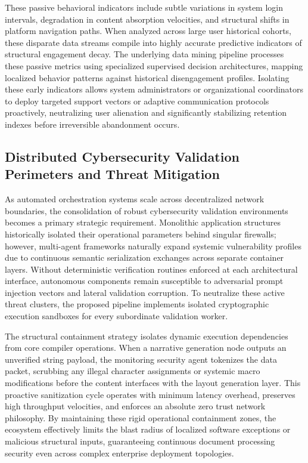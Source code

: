 These passive behavioral indicators include subtle variations in system login intervals, degradation in content absorption velocities, and structural shifts in platform navigation paths. When analyzed across large user historical cohorts, these disparate data streams compile into highly accurate predictive indicators of structural engagement decay. The underlying data mining pipeline processes these passive metrics using specialized supervised decision architectures, mapping localized behavior patterns against historical disengagement profiles. Isolating these early indicators allows system administrators or organizational coordinators to deploy targeted support vectors or adaptive communication protocols proactively, neutralizing user alienation and significantly stabilizing retention indexes before irreversible abandonment occurs.

\subsection{Distributed Cybersecurity Validation Perimeters and Threat Mitigation}
As automated orchestration systems scale across decentralized network boundaries, the consolidation of robust cybersecurity validation environments becomes a primary strategic requirement. Monolithic application structures historically isolated their operational parameters behind singular firewalls; however, multi-agent frameworks naturally expand systemic vulnerability profiles due to continuous semantic serialization exchanges across separate container layers. Without deterministic verification routines enforced at each architectural interface, autonomous components remain susceptible to adversarial prompt injection vectors and lateral validation corruption. To neutralize these active threat clusters, the proposed pipeline implements isolated cryptographic execution sandboxes for every subordinate validation worker.

The structural containment strategy isolates dynamic execution dependencies from core compiler operations. When a narrative generation node outputs an unverified string payload, the monitoring security agent tokenizes the data packet, scrubbing any illegal character assignments or systemic macro modifications before the content interfaces with the layout generation layer. This proactive sanitization cycle operates with minimum latency overhead, preserves high throughput velocities, and enforces an absolute zero trust network philosophy. By maintaining these rigid operational containment zones, the ecosystem effectively limits the blast radius of localized software exceptions or malicious structural inputs, guaranteeing continuous document processing security even across complex enterprise deployment topologies.

